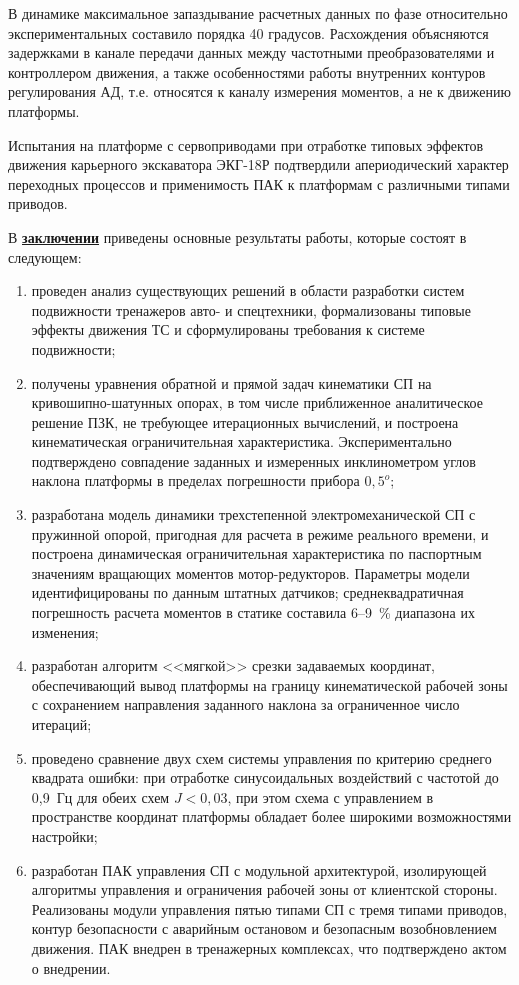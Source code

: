 В динамике максимальное запаздывание расчетных данных по фазе относительно экспериментальных составило порядка 40 градусов. Расхождения объясняются задержками в канале передачи данных между частотными преобразователями и контроллером движения, а также особенностями работы внутренних контуров регулирования АД, т.е. относятся к каналу измерения моментов, а не к движению платформы.

Испытания на платформе с сервоприводами при отработке типовых эффектов движения карьерного экскаватора ЭКГ-18Р подтвердили апериодический характер переходных процессов и применимость ПАК к платформам с различными типами приводов.

В \underline{\textbf{заключении}} приведены основные результаты работы, которые состоят в следующем:
\begin{enumerate}

\item проведен анализ существующих решений в области разработки систем подвижности тренажеров авто- и спецтехники, формализованы типовые эффекты движения ТС и сформулированы требования к системе подвижности;

\item получены уравнения обратной и прямой задач кинематики СП на кривошипно-шатунных опорах, в том числе приближенное аналитическое решение ПЗК, не требующее итерационных вычислений, и построена кинематическая ограничительная характеристика. Экспериментально подтверждено совпадение заданных и измеренных инклинометром углов наклона платформы в пределах погрешности прибора $0,5^o$;

\item разработана модель динамики трехстепенной электромеханической СП с пружинной опорой, пригодная для расчета в режиме реального времени, и построена динамическая ограничительная характеристика по паспортным значениям вращающих моментов мотор-редукторов. Параметры модели идентифицированы по данным штатных датчиков; среднеквадратичная погрешность расчета моментов в статике составила 6--9~\% диапазона их изменения;

\item разработан алгоритм <<мягкой>> срезки задаваемых координат, обеспечивающий вывод платформы на границу кинематической рабочей зоны с сохранением направления заданного наклона за ограниченное число итераций;

\item проведено сравнение двух схем системы управления по критерию среднего квадрата ошибки: при отработке синусоидальных воздействий с частотой до 0,9~Гц для обеих схем $J < 0,03$, при этом схема с управлением в пространстве координат платформы обладает более широкими возможностями настройки;

\item разработан ПАК управления СП с модульной архитектурой, изолирующей алгоритмы управления и ограничения рабочей зоны от клиентской стороны. Реализованы модули управления пятью типами СП с тремя типами приводов, контур безопасности с аварийным остановом и безопасным возобновлением движения. ПАК внедрен в тренажерных комплексах, что подтверждено актом о внедрении.

\end{enumerate}
